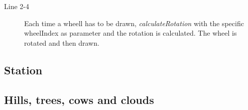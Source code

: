 \begin{description}
\item[Line 2-4] Each time a wheell has to be drawn, \textit{calculateRotation} with the specific wheelIndex as parameter and the rotation is calculated. The wheel is rotated and then drawn. 
\end{description}

\subsection{Station}

\subsection{Hills, trees, cows and clouds}